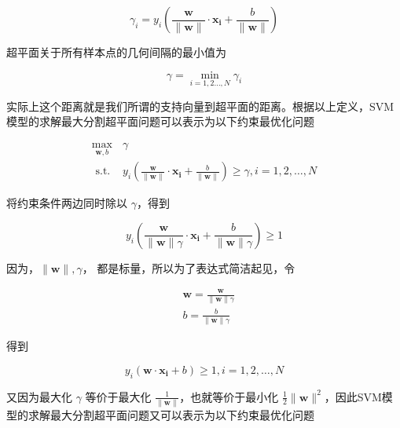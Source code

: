 \begin{equation}
	\gamma_i=y_i\left(\frac{\boldsymbol{w}}{\|\boldsymbol{w}\|} \cdot \boldsymbol{x}_{\boldsymbol{i}}+\frac{b}{\|\boldsymbol{w}\|}\right)
\end{equation}


超平面关于所有样本点的几何间隔的最小值为

\begin{equation}
\gamma=\min _{i=1,2 \ldots, N} \gamma_i
\end{equation}

实际上这个距离就是我们所谓的支持向量到超平面的距离。根据以上定义，SVM模型的求解最大分割超平面问题可以表示为以下约束最优化问题

\begin{equation}
\begin{array}{ll}
\max _{\boldsymbol{w}, b} & \gamma \\
\text { s.t. } & y_i\left(\frac{\boldsymbol{w}}{\|\boldsymbol{w}\|} \cdot \boldsymbol{x}_{\boldsymbol{i}}+\frac{b}{\|\boldsymbol{w}\|}\right) \geq \gamma, i=1,2, \ldots, N
\end{array}
\end{equation}

将约束条件两边同时除以 $\gamma$，得到

\begin{equation}
y_i\left(\frac{\boldsymbol{w}}{\|\boldsymbol{w}\| \gamma} \cdot \boldsymbol{x}_{\boldsymbol{i}}+\frac{b}{\|\boldsymbol{w}\| \gamma}\right) \geq 1
\end{equation}

因为，$\|\boldsymbol{w}\|, \gamma$， 都是标量，所以为了表达式简洁起见，令

\begin{equation}
\begin{aligned}
&\boldsymbol{w}=\frac{\boldsymbol{w}}{\|\boldsymbol{w}\| \gamma} \\
&b=\frac{b}{\|\boldsymbol{w}\| \gamma}
\end{aligned}
\end{equation}

得到

\begin{equation}
y_i\left(\boldsymbol{w} \cdot \boldsymbol{x}_{\boldsymbol{i}}+b\right) \geq 1, i=1,2, \ldots, N
\end{equation}

又因为最大化 $\gamma$ 等价于最大化 $\frac{1}{\|\boldsymbol{w}\|}$，也就等价于最小化 $\frac{1}{2}\|\boldsymbol{w}\|^2$，因此SVM模型的求解最大分割超平面问题又可以表示为以下约束最优化问题

